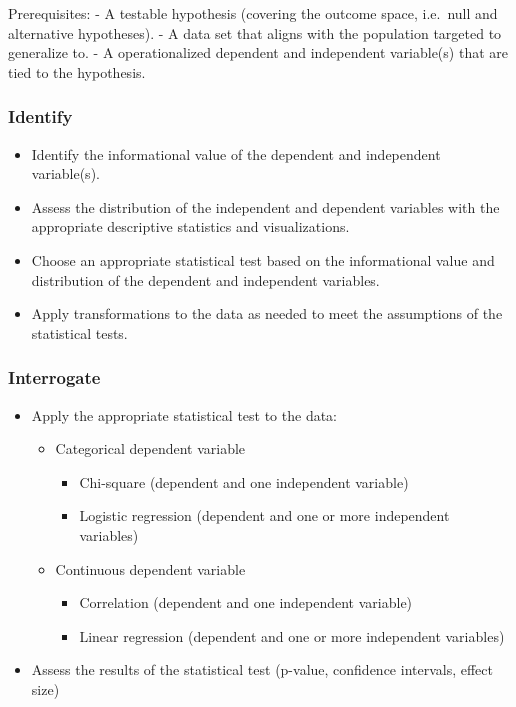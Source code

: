 \documentclass[
  letterpaper,
]{latex/krantz}
\providecommand{\tightlist}{%
  \setlength{\itemsep}{0pt}\setlength{\parskip}{0pt}}\usepackage{longtable,booktabs,array}
\begin{document}
Prerequisites: - A testable hypothesis (covering the outcome space,
i.e.~null and alternative hypotheses). - A data set that aligns with the
population targeted to generalize to. - A operationalized dependent and
independent variable(s) that are tied to the hypothesis.

\hypertarget{ida-identify}{%
\subsubsection{Identify}\label{ida-identify}}

\begin{itemize}
\tightlist
\item
  Identify the informational value of the dependent and independent
  variable(s).
\item
  Assess the distribution of the independent and dependent variables
  with the appropriate descriptive statistics and visualizations.
\item
  Choose an appropriate statistical test based on the informational
  value and distribution of the dependent and independent variables.
\item
  Apply transformations to the data as needed to meet the assumptions of
  the statistical tests.
\end{itemize}

\hypertarget{ida-interrogate}{%
\subsubsection{Interrogate}\label{ida-interrogate}}

\begin{itemize}
\tightlist
\item
  Apply the appropriate statistical test to the data:

  \begin{itemize}
  \tightlist
  \item
    Categorical dependent variable

    \begin{itemize}
    \tightlist
    \item
      Chi-square (dependent and one independent variable)
    \item
      Logistic regression (dependent and one or more independent
      variables)
    \end{itemize}
  \item
    Continuous dependent variable

    \begin{itemize}
    \tightlist
    \item
      Correlation (dependent and one independent variable)
    \item
      Linear regression (dependent and one or more independent
      variables)
    \end{itemize}
  \end{itemize}
\item
  Assess the results of the statistical test (p-value, confidence
  intervals, effect size)
\end{itemize}
\end{document}
